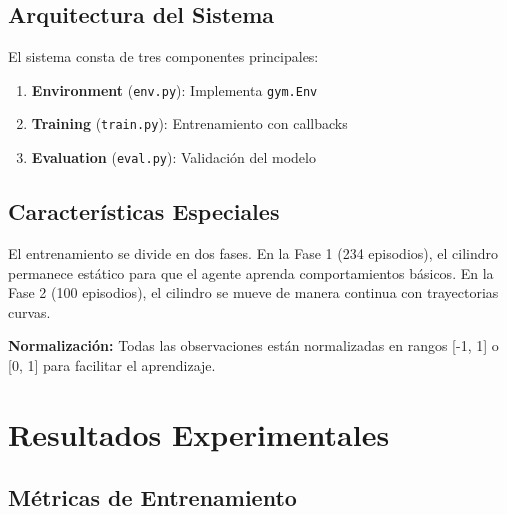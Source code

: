\documentclass[12pt,a4paper]{article}
\begin{document}
\subsection{Arquitectura del Sistema}

El sistema consta de tres componentes principales:

\begin{enumerate}
    \item \textbf{Environment} (\texttt{env.py}): Implementa \texttt{gym.Env}
    \item \textbf{Training} (\texttt{train.py}): Entrenamiento con callbacks
    \item \textbf{Evaluation} (\texttt{eval.py}): Validación del modelo
\end{enumerate}

\subsection{Características Especiales}

El entrenamiento se divide en dos fases. En la Fase 1 (234 episodios), el cilindro permanece estático para que el agente aprenda comportamientos básicos. En la Fase 2 (100 episodios), el cilindro se mueve de manera continua con trayectorias curvas.

\setlength{\parskip}{0.5em}

\textbf{Normalización:} Todas las observaciones están normalizadas en rangos [-1, 1] o [0, 1] para facilitar el aprendizaje.

\section{Resultados Experimentales} 

\subsection{Métricas de Entrenamiento}
\end{document}
